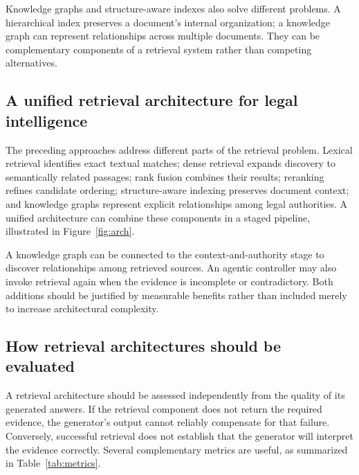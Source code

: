 Knowledge graphs and structure-aware indexes also solve different problems. A hierarchical index
preserves a document's internal organization; a knowledge graph can represent relationships across
multiple documents. They can be complementary components of a retrieval system rather than competing
alternatives.

\subsection{A unified retrieval architecture for legal intelligence}

The preceding approaches address different parts of the retrieval problem. Lexical retrieval identifies
exact textual matches; dense retrieval expands discovery to semantically related passages; rank fusion
combines their results; reranking refines candidate ordering; structure-aware indexing preserves
document context; and knowledge graphs represent explicit relationships among legal authorities. A
unified architecture can combine these components in a staged pipeline, illustrated in
Figure~\ref{fig:arch}.



A knowledge graph can be connected to the context-and-authority stage to discover relationships among
retrieved sources. An agentic controller may also invoke retrieval again when the evidence is
incomplete or contradictory. Both additions should be justified by measurable benefits rather than
included merely to increase architectural complexity.

\subsection{How retrieval architectures should be evaluated}

A retrieval architecture should be assessed independently from the quality of its generated answers.
If the retrieval component does not return the required evidence, the generator's output cannot
reliably compensate for that failure. Conversely, successful retrieval does not establish that the
generator will interpret the evidence correctly. Several complementary metrics are useful, as
summarized in Table~\ref{tab:metrics}.

